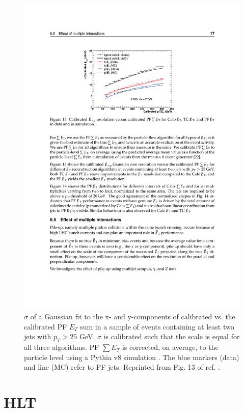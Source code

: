 \documentclass[dissertation.tex]{subfiles}
\begin{document}
\begin{figure}
	\centering
	\includegraphics[scale=1.0]{MET_resolution}
	\caption{$\sigma$ of a Gaussian fit to the x- and y-components of calibrated \MET vs. the calibrated PF $E_{T}$ sum in a sample of events containing at least two jets with $p_{T} > 25$ GeV.  $\sigma$ is calibrated such that the \MET scale is equal for all three algorithms.  PF $\sum E_{T}$ is corrected, on average, to the particle level using a Pythia v8 simulation \cite{Pythia8}.  The blue markers (data) and line (MC) refer to PF jets.  Reprinted from Fig. 13 of ref. \cite{CMS_MET_paper}.}
	\label{fig:MET_resolution}
\end{figure}

\section{HLT}
\label{sec:HLT}
\end{document}
